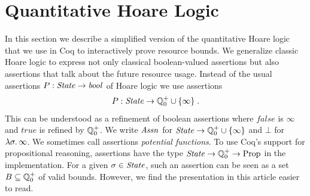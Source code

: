 \documentclass[nocopyrightspace,preprint]{sigplanconf}
\newcommand{\ifshort}[2]{\ifx\fullversion\undefined{#1}\else{#2}\fi}
\newcommand{\sectskip}[0]{\ifshort{\vspace{-3pt}}{}}
\newcommand{\aftersectskip}[0]{\ifshort{\vspace{-1pt}}{}}
\begin{document}
\sectskip
\section{Quantitative Hoare Logic}
\label{sec:logic}
\aftersectskip

In this section we describe a simplified version of the quantitative
Hoare logic that we use in Coq to interactively prove resource bounds.
%
We generalize classic Hoare logic to express not only classical
boolean-valued assertions but also assertions that talk about the
future resource usage.  Instead of the usual assertions $P : \mathit{State}
\to \mathit{bool}$ of Hoare logic we use assertions
$$
P : \mathit{State} \to \mathbb Q^+_0 \cup \{ \infty \} \; .
$$
This can be understood as a refinement of boolean assertions where
$\mathit{false}$ is $\infty$ and $\mathit{true}$ is refined by $\mathbb Q^+_0$.
We write $\mathit{Assn}$ for $\mathit{State} \to \mathbb Q^+_0 \cup \{ \infty \}$ and $\bot$ for
$\lambda \sigma . \, \infty$.  We sometimes call assertions
\emph{potential functions}.  To use Coq's support for propositional
reasoning, assertions have the type $\mathit{State} \to \mathbb Q^+_0 \to \mathrm{Prop}$
in the implementation.  For a given $\sigma \in \mathit{State}$, such an
assertion can be seen as a set $B \subseteq \mathbb Q^+_0$ of valid bounds.
However, we find the presentation in this article easier to read.
\end{document}
